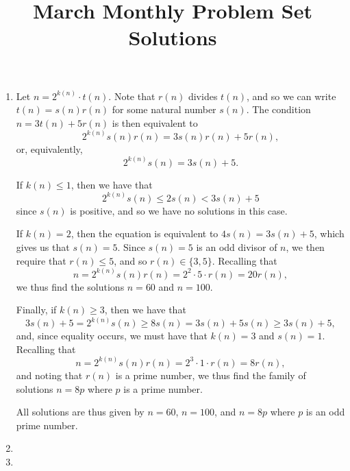 \documentclass[12pt]{article}
\title{\vspace{-24pt}March Monthly Problem Set Solutions}
\author{\vspace{-24pt}}
\date{\vspace{-24pt}}
\begin{document}
 \maketitle \pagestyle{empty}

\begin{enumerate}

\item %
Let $n = 2^{k(n)} \cdot t(n)$. Note that $r(n)$ divides $t(n)$, and so we can
write $t(n) = s(n) r(n)$ for some natural number $s(n)$. The condition $n =
3t(n) + 5r(n)$ is then equivalent to
\[
    2^{k(n)} s(n) r(n) = 3 s(n) r(n) + 5r(n),
\]
or, equivalently,
\[
    2^{k(n)} s(n) = 3s(n) + 5.
\]

If $k(n) \leq 1$, then we have that
\[
    2^{k(n)} s(n) \leq 2s(n) < 3s(n) + 5
\]
since $s(n)$ is positive, and so we have no solutions in this case.

If $k(n) = 2$, then the equation is equivalent to $4s(n) = 3s(n) + 5$, which
gives us that $s(n) = 5$. Since $s(n) = 5$ is an odd divisor of $n$, we then
require that $r(n) \leq 5$, and so $r(n) \in \{3, 5\}$. Recalling that
\[
    n = 2^{k(n)} s(n) r(n) = 2^2 \cdot 5 \cdot r(n) = 20 r(n),
\]
we thus find the solutions $n = 60$ and $n = 100$.

Finally, if $k(n) \geq 3$, then we have that
\[
    3s(n) + 5 = 2^{k(n)} s(n) \geq 8 s(n) = 3s(n) + 5s(n) \geq 3s(n) + 5,
\]
and, since equality occurs, we must have that $k(n) = 3$ and $s(n) = 1$.
Recalling that
\[
    n = 2^{k(n)} s(n) r(n) = 2^3 \cdot 1 \cdot r(n) = 8r(n),
\]
and noting that $r(n)$ is a prime number, we thus find the family of solutions
$n = 8p$ where $p$ is a prime number.

All solutions are thus given by $n = 60$, $n = 100$, and $n = 8p$ where $p$ is
an odd prime number.


\item %


\item %


\end{enumerate}
\end{document}
